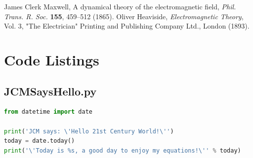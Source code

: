 \documentclass[11pt,oneside,a4paper]{article}
\begin{document}
\begin{thebibliography}{9}
 James Clerk Maxwell, A dynamical theory of the electromagnetic field, \textit{Phil. Trans. R. Soc.} \textbf{155}, 459–512 (1865).
 Oliver Heaviside, \textit{Electromagnetic Theory}, Vol. 3, "The Electrician" Printing and Publishing Company Ltd., London (1893).

\end{thebibliography}

\appendix

\section{Code Listings}

\subsection{JCMSaysHello.py}

\begin{lstlisting}[language=python]
from datetime import date

print('JCM says: \'Hello 21st Century World!\'')
today = date.today()
print('\'Today is %s, a good day to enjoy my equations!\'' % today)
\end{lstlisting}
\end{document}
